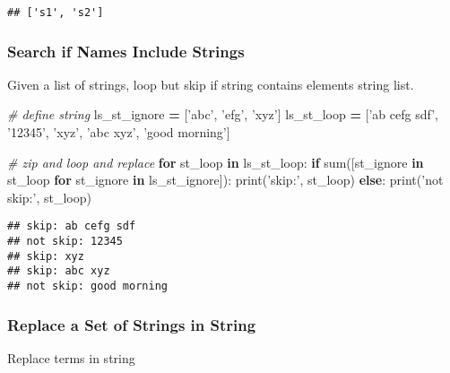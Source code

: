 \documentclass[
]{book}
\newenvironment{Shaded}{\begin{snugshade}}{\end{snugshade}}
\newcommand{\BuiltInTok}[1]{#1}
\newcommand{\CommentTok}[1]{\textcolor[rgb]{0.56,0.35,0.01}{\textit{#1}}}
\newcommand{\ControlFlowTok}[1]{\textcolor[rgb]{0.13,0.29,0.53}{\textbf{#1}}}
\newcommand{\KeywordTok}[1]{\textcolor[rgb]{0.13,0.29,0.53}{\textbf{#1}}}
\newcommand{\NormalTok}[1]{#1}
\newcommand{\OperatorTok}[1]{\textcolor[rgb]{0.81,0.36,0.00}{\textbf{#1}}}
\newcommand{\StringTok}[1]{\textcolor[rgb]{0.31,0.60,0.02}{#1}}
\begin{document}
\begin{verbatim}
## ['s1', 's2']
\end{verbatim}

\hypertarget{search-if-names-include-strings}{%
\subsubsection{Search if Names Include Strings}\label{search-if-names-include-strings}}

Given a list of strings, loop but skip if string contains elements string list.

\begin{Shaded}
\begin{Highlighting}[]
\CommentTok{# define string}
\NormalTok{ls_st_ignore }\OperatorTok{=}\NormalTok{ [}\StringTok{'abc'}\NormalTok{, }\StringTok{'efg'}\NormalTok{, }\StringTok{'xyz'}\NormalTok{]}
\NormalTok{ls_st_loop }\OperatorTok{=}\NormalTok{ [}\StringTok{'ab cefg sdf'}\NormalTok{, }\StringTok{'12345'}\NormalTok{, }\StringTok{'xyz'}\NormalTok{, }\StringTok{'abc xyz'}\NormalTok{, }\StringTok{'good morning'}\NormalTok{]}

\CommentTok{# zip and loop and replace}
\ControlFlowTok{for}\NormalTok{ st_loop }\KeywordTok{in}\NormalTok{ ls_st_loop:}
  \ControlFlowTok{if} \BuiltInTok{sum}\NormalTok{([st_ignore }\KeywordTok{in}\NormalTok{ st_loop }\ControlFlowTok{for}\NormalTok{ st_ignore }\KeywordTok{in}\NormalTok{ ls_st_ignore]):}
    \BuiltInTok{print}\NormalTok{(}\StringTok{'skip:'}\NormalTok{, st_loop)}
  \ControlFlowTok{else}\NormalTok{:}
    \BuiltInTok{print}\NormalTok{(}\StringTok{'not skip:'}\NormalTok{, st_loop)}
\end{Highlighting}
\end{Shaded}

\begin{verbatim}
## skip: ab cefg sdf
## not skip: 12345
## skip: xyz
## skip: abc xyz
## not skip: good morning
\end{verbatim}

\hypertarget{replace-a-set-of-strings-in-string}{%
\subsubsection{Replace a Set of Strings in String}\label{replace-a-set-of-strings-in-string}}

Replace terms in string
\end{document}
